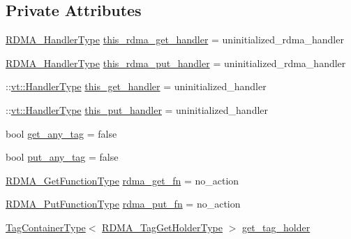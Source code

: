 \subsection*{Private Attributes}
\begin{DoxyCompactItemize}
\item 
\hyperlink{namespacevt_a9530efb893c0f3846e8ac5f0507e0f49}{R\+D\+M\+A\+\_\+\+Handler\+Type} \hyperlink{structvt_1_1rdma_1_1_state_ae091709bf3364a91d10cc073c2fe33ab}{this\+\_\+rdma\+\_\+get\+\_\+handler} = uninitialized\+\_\+rdma\+\_\+handler
\item 
\hyperlink{namespacevt_a9530efb893c0f3846e8ac5f0507e0f49}{R\+D\+M\+A\+\_\+\+Handler\+Type} \hyperlink{structvt_1_1rdma_1_1_state_a034ffba15dbf9825d80d15ba569c9b78}{this\+\_\+rdma\+\_\+put\+\_\+handler} = uninitialized\+\_\+rdma\+\_\+handler
\item 
\+::\hyperlink{namespacevt_af64846b57dfcaf104da3ef6967917573}{vt\+::\+Handler\+Type} \hyperlink{structvt_1_1rdma_1_1_state_aaf5cfa0e6200282d9d3c6e29a0a40849}{this\+\_\+get\+\_\+handler} = uninitialized\+\_\+handler
\item 
\+::\hyperlink{namespacevt_af64846b57dfcaf104da3ef6967917573}{vt\+::\+Handler\+Type} \hyperlink{structvt_1_1rdma_1_1_state_aa0157a4dd90369d4d23e0aa79569d333}{this\+\_\+put\+\_\+handler} = uninitialized\+\_\+handler
\item 
bool \hyperlink{structvt_1_1rdma_1_1_state_a63baf560dc97aa97037e6a3301739d00}{get\+\_\+any\+\_\+tag} = false
\item 
bool \hyperlink{structvt_1_1rdma_1_1_state_a934ef23284043246b24c3f746919bc79}{put\+\_\+any\+\_\+tag} = false
\item 
\hyperlink{structvt_1_1rdma_1_1_state_af0baaa6ac5c3b7b256d032f2ee845676}{R\+D\+M\+A\+\_\+\+Get\+Function\+Type} \hyperlink{structvt_1_1rdma_1_1_state_a5fc424bbd04560454b020ab57409100e}{rdma\+\_\+get\+\_\+fn} = no\+\_\+action
\item 
\hyperlink{structvt_1_1rdma_1_1_state_aa43a5d043fe01086818e9c5c364341d4}{R\+D\+M\+A\+\_\+\+Put\+Function\+Type} \hyperlink{structvt_1_1rdma_1_1_state_a110a8f6b7d4be259748e173cdb03d341}{rdma\+\_\+put\+\_\+fn} = no\+\_\+action
\item 
\hyperlink{structvt_1_1rdma_1_1_state_ad84b403803cc575ef54d0d0ac74017e9}{Tag\+Container\+Type}$<$ \hyperlink{structvt_1_1rdma_1_1_state_a10b0ce4a13ce643ca2a944dd05c601ff}{R\+D\+M\+A\+\_\+\+Tag\+Get\+Holder\+Type} $>$ \hyperlink{structvt_1_1rdma_1_1_state_a203be63dac93d826d17bcf3264270eb2}{get\+\_\+tag\+\_\+holder}
\item 

\end{DoxyCompactItemize}
